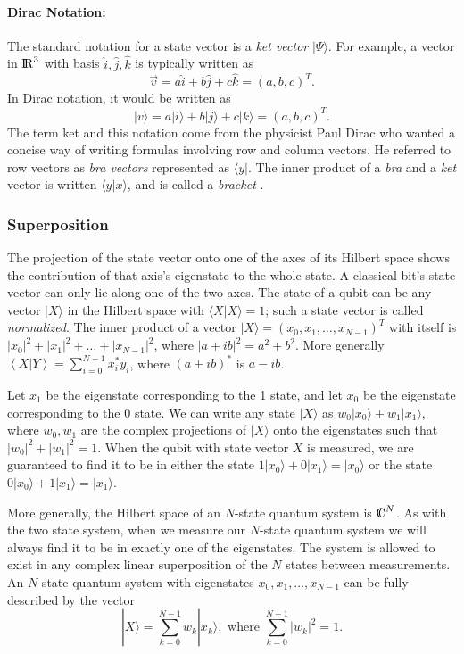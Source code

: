 \paragraph{Dirac Notation:}

The standard notation for a state vector is a \emph{ket vector}
$|\Psi\rangle$.  For example, a vector in $\mathrm{I\!R}^{3}$ with basis
$\hat{i},\hat{j},\hat{k}$ is typically written as
\[
\vec{v} =  a\hat{i}  +  b\hat{j}  +  c\hat{k}  =  (a,b,c)^{T} .
\]
In Dirac notation, it would be written as
\[
|v\rangle  =  a|i\rangle  +  b|j\rangle +  c|k\rangle  = 
(a,b,c)^{T}. 
\]
The term ket and this notation come from the physicist Paul Dirac who
wanted a concise way of writing formulas involving row and column
vectors.  He referred to row vectors as \emph{bra vectors} represented
as $\langle y|$.  The inner product of a \emph{bra} and a \emph{ket}
vector is written $\langle y|x\rangle$, and is called a \emph{bracket}
\cite{williams98quantum}.

\subsubsection{Superposition}

The projection of the state vector onto one of the axes of its Hilbert
space shows the contribution of that axis's eigenstate to the whole
state.  A classical bit's state vector can only lie along one of the
two axes.  The state of a qubit can be any vector $|X\rangle$ in the
Hilbert space with $\langle X|X\rangle = 1$; such a state vector is
called \emph{normalized}.  The inner product of a vector $|X\rangle =
(x_{0},x_{1},\ldots, x_{N-1})^{T}$ with itself is $|x_{0}|^{2} +
|x_{1}|^{2} + \ldots + |x_{N-1}|^{2}$, where $|a+ib|^{2} = a^{2} +
b^{2}$.  More generally $\left\langle X|Y\right\rangle = \sum_{i =
0}^{N-1} x_{i}^{*}y_{i}$, where $(a + ib)^{*}$ is $a - ib$.

Let $x_{1}$ be the eigenstate corresponding to the 1 state, and let
$x_{0}$ be the eigenstate corresponding to the 0 state.  We can write
any state $|X\rangle$ as $w_{0}|x_{0}\rangle + w_{1}|x_{1}\rangle$,
where $w_{0}, w_{1}$ are the complex projections of $|X\rangle$ onto
the eigenstates such that $|w_{0}|^{2} + |w_{1}|^{2} = 1$.  When the
qubit with state vector $X$ is measured, we are guaranteed to find it
to be in either the state $1 |x_{0} \rangle + 0 |x_{1} \rangle =
|x_{0}\rangle$ or the state $0 |x_{0} \rangle + 1 |x_{1} \rangle =
|x_{1}\rangle$.

More generally, the Hilbert space of an $N$-state quantum system is
$\Complex^{N}$.  As with the two state system, when we measure our
$N$-state quantum system we will always find it to be in exactly one
of the eigenstates.  The system is allowed to exist in any complex
linear superposition of the $N$ states between measurements.  An
$N$-state quantum system with eigenstates $x_{0}, x_{1},\ldots,
x_{N-1}$ can be fully described by the vector
\[|X \rangle = \sum_{k = 0}^{N-1} w_{k} |x_{k} \rangle, 
\textrm{ where }
\sum_{k = 0}^{N-1} |w_{k}|^{2} = 1.
\]


